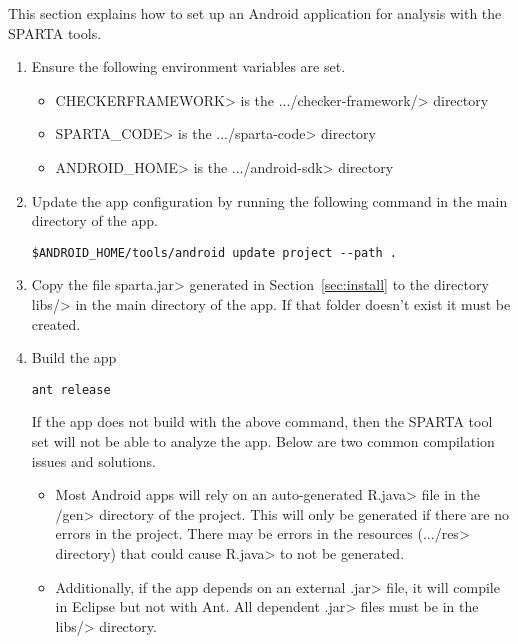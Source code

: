This section explains how to set up an Android application for analysis with the SPARTA tools.
\begin{enumerate}

\item
Ensure the following environment variables are set. 

\begin{itemize}
\item
\<CHECKERFRAMEWORK> is the
\<.../checker-framework/> directory

\item
\<SPARTA\_CODE> is the \<.../sparta-code> directory

\item
\<ANDROID\_HOME> is the \<.../android-sdk> directory

\end{itemize}
\item
Update the app configuration by running the following command in the main directory of the
app.
\begin{Verbatim}
$ANDROID_HOME/tools/android update project --path .
\end{Verbatim}

\item
Copy the file \<sparta.jar> generated in Section~\ref{sec:install} to the
directory \<libs/> in the main directory of the app. If that folder doesn't
exist it must be created.

\item Build the app

\begin{Verbatim}
ant release
\end{Verbatim}
If the app does not build with the above command, then the SPARTA tool set will 
not be able to analyze the app.  Below are two common compilation issues and
solutions.
\begin{itemize}
\item
Most Android apps will rely on an auto-generated \<R.java> file
in the \</gen> directory of the project. This will only be generated
if there are no errors in the project. There may be errors in the
resources (\<.../res> directory) that could cause \<R.java> to not be
generated.

\item
Additionally, if the app depends on an external \<.jar> file, it will compile
in Eclipse but not with Ant. All dependent \<.jar> files must be in the
\<libs/> directory.
\end{itemize}




\end{enumerate}
